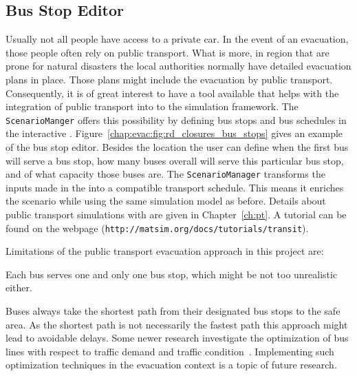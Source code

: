 \subsection{Bus Stop Editor}
Usually not all people have access to a private car. In the event of an evacuation, those people often rely on public transport. What is more, in region that are prone for natural disasters the local authorities normally have detailed evacuation plans in place. Those plans might include the evacuation by public transport. Consequently, it is of great interest to have a tool available that helps with the integration of public transport into to the simulation framework. The \lstinline|ScenarioManger| offers this possibility by defining bus stops and bus schedules in the interactive . Figure~\ref{chap:evac:fig:rd_closures_bus_stops} gives an example of the bus stop editor. Besides the location the user can define when the first bus will serve a bus stop, how many buses overall will serve this particular bus stop, and of what capacity those buses are. 
The \lstinline|ScenarioManager| transforms the inputs made in the  into a  compatible transport schedule. This means it enriches the scenario while using the same simulation model as before. Details about public transport simulations with  are given in Chapter~\ref{ch:pt}. A tutorial can be found on the  webpage (\lstinline|http://matsim.org/docs/tutorials/transit|).

Limitations of the public transport evacuation approach in this project are:
\begin{compactitem}
\item Each bus serves one and only one bus stop, which might be not too unrealistic either.
\item Buses always take the shortest path from their designated bus stops to the safe area. As the shortest path is not necessarily the fastest path this approach might lead to avoidable delays. Some newer research investigate the optimization of bus lines with respect to traffic demand and traffic condition~\citep{Neumann_PhDThesis_2014}. Implementing such optimization techniques in the evacuation context is a topic of future research.
\end{compactitem}

